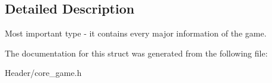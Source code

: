 \subsection{Detailed Description}
Most important type -\/ it contains every major information of the game. 

The documentation for this struct was generated from the following file\+:\begin{DoxyCompactItemize}
\item 
Header/core\+\_\+game.\+h\end{DoxyCompactItemize}
